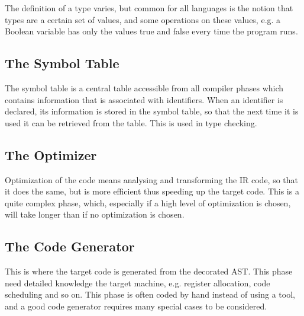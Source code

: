 The definition of a type varies, but common for all languages is the notion that types are a certain set of values, and some operations on these values, e.g. a Boolean variable has only the values true and false every time the program runs.

\subsection{The Symbol Table}

The symbol table is a central table accessible from all compiler phases which contains information that is associated with identifiers. When an identifier is declared, its information is stored in the symbol table, so that the next time it is used it can be retrieved from the table. This is used in type checking.

\subsection{The Optimizer}

Optimization of the code means analysing and transforming the IR code, so that it does the same, but is more efficient thus speeding up the target code. This is a quite complex phase, which, especially if a high level of optimization is chosen, will take longer than if no optimization is chosen.

\subsection{The Code Generator}
This is where the target code is generated from the decorated AST. This phase need detailed knowledge the target machine, e.g. register allocation, code scheduling and so on. This phase is often coded by hand instead of using a tool, and a good code generator requires many special cases to be considered.